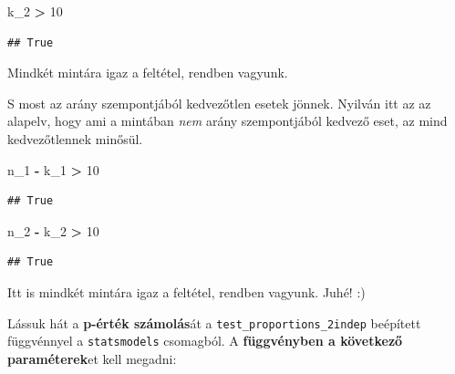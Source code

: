 \documentclass[
]{book}
\newenvironment{Shaded}{\begin{snugshade}}{\end{snugshade}}
\newcommand{\DecValTok}[1]{\textcolor[rgb]{0.00,0.00,0.81}{#1}}
\newcommand{\NormalTok}[1]{#1}
\newcommand{\OperatorTok}[1]{\textcolor[rgb]{0.81,0.36,0.00}{\textbf{#1}}}
\begin{document}
\begin{Shaded}
\begin{Highlighting}[]
\NormalTok{k\_2 }\OperatorTok{\textgreater{}} \DecValTok{10}
\end{Highlighting}
\end{Shaded}

\begin{verbatim}
## True
\end{verbatim}

Mindkét mintára igaz a feltétel, rendben vagyunk.

S most az arány szempontjából kedvezőtlen esetek jönnek. Nyilván itt az az alapelv, hogy ami a mintában \emph{nem} arány szempontjából kedvező eset, az mind kedvezőtlennek minősül.

\begin{Shaded}
\begin{Highlighting}[]
\NormalTok{n\_1 }\OperatorTok{{-}}\NormalTok{ k\_1 }\OperatorTok{\textgreater{}} \DecValTok{10}
\end{Highlighting}
\end{Shaded}

\begin{verbatim}
## True
\end{verbatim}

\begin{Shaded}
\begin{Highlighting}[]
\NormalTok{n\_2 }\OperatorTok{{-}}\NormalTok{ k\_2 }\OperatorTok{\textgreater{}} \DecValTok{10}
\end{Highlighting}
\end{Shaded}

\begin{verbatim}
## True
\end{verbatim}

Itt is mindkét mintára igaz a feltétel, rendben vagyunk. Juhé! :)

Lássuk hát a \textbf{p-érték számolás}át a \texttt{test\_proportions\_2indep} beépített függvénnyel a \texttt{statsmodels} csomagból.
A \textbf{függvényben a következő paraméterek}et kell megadni:
\end{document}
